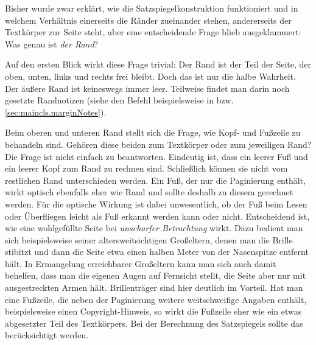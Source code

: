 \begin{Declaration}
\end{Declaration}%
\begin{Explain}%
  Bisher wurde zwar erklärt, wie die
  Satzspiegelkonstruktion funktioniert und in welchem
  Verhältnis einerseits die Ränder zueinander stehen, andererseits
  der Textkörper zur Seite steht, aber eine entscheidende Frage blieb
  ausgeklammert: Was genau ist \emph{der Rand}?

  Auf den ersten Blick wirkt diese Frage trivial: Der Rand ist der Teil der
  Seite, der oben, unten, links und rechts frei bleibt. Doch das ist nur die
  halbe Wahrheit. Der äußere Rand ist keineswegs immer leer. Teilweise findet
  man darin noch gesetzte Randnotizen (siehe den Befehl
   beispielsweise in \cite{l2kurz}
  bzw. \autoref{sec:maincls.marginNotes}).

  Beim oberen und unteren Rand stellt sich die Frage, wie Kopf- und
  Fußzeile zu behandeln sind.
  Gehören diese beiden zum Textkörper oder zum jeweiligen Rand? Die Frage ist
  nicht einfach zu beantworten.  Eindeutig ist, dass ein leerer Fuß und ein
  leerer Kopf zum Rand zu rechnen sind. Schließlich können sie nicht vom
  restlichen Rand unterschieden werden. Ein Fuß, der nur die
  Paginierung
  \iffalse %
  \unskip\footnote{Unter der Paginierung versteht man die Angabe der
    Seitenzahl, wahlweise innerhalb oder außerhalb des Satzspiegels, meist im
    Kopf oder Fuß der Seite.} %
  \fi enthält, wirkt optisch ebenfalls eher wie Rand und sollte deshalb zu
  diesem gerechnet werden. Für die optische Wirkung ist dabei unwesentlich, ob
  der Fuß beim Lesen oder Überfliegen leicht als Fuß erkannt werden kann oder
  nicht. Entscheidend ist, wie eine wohlgefüllte Seite bei \emph{unscharfer
    Betrachtung} wirkt. Dazu bedient man sich beispielsweise seiner
  altersweitsichtigen Großeltern, denen man die Brille stibitzt und dann die
  Seite etwa einen halben Meter von der Nasenspitze entfernt hält. In
  Ermangelung erreichbarer Großeltern kann man sich auch damit behelfen, dass
  man die eigenen Augen auf Fernsicht stellt, die Seite aber nur mit
  ausgestreckten Armen hält. Brillenträger sind hier deutlich im Vorteil. Hat
  man eine Fußzeile, die neben der Paginierung weitere weitschweifige Angaben
  enthält, beispielsweise einen Copyright-Hinweis, so wirkt die Fußzeile eher
  wie ein etwas abgesetzter Teil des Textkörpers. Bei der Berechnung des
  Satzspiegels sollte das berücksichtigt werden.
  

\end{Explain}
